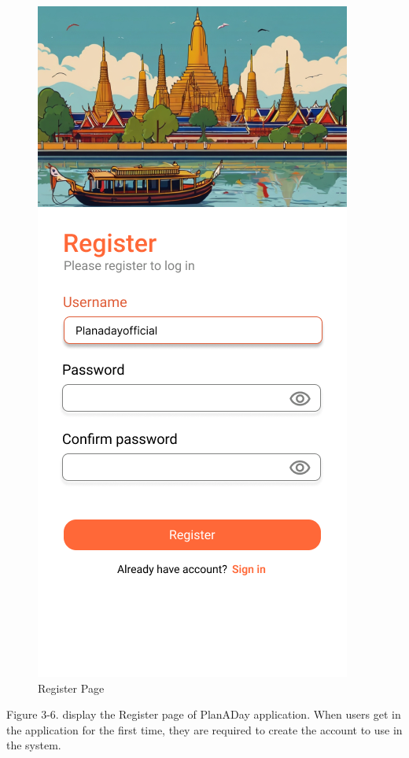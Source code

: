 \newpage
\begin{figure}[!h]
    \centering
    \includegraphics[width=0.5\linewidth]{chapter3/UI_Register_page.png}
    \caption{Register Page}
    \label{fig:Register Page}
\end{figure}
\noindent
Figure 3-6. display the Register page of PlanADay application. When users get in
the application for the first time, they are required to create the account to use in the
system.

